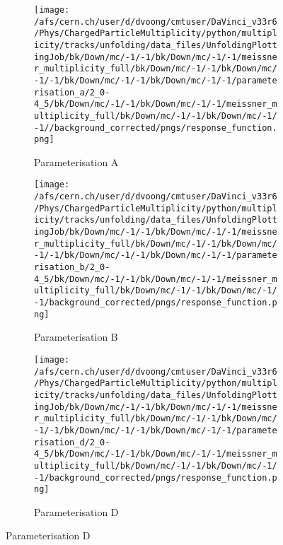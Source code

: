 \begin{figure}[h]
	\begin{subfigure}{0.49\textwidth}
		\texttt{[image: /afs/cern.ch/user/d/dvoong/cmtuser/DaVinci\_v33r6/Phys/ChargedParticleMultiplicity/python/multiplicity/tracks/unfolding/data\_files/UnfoldingPlottingJob/bk/Down/mc/-1/-1/bk/Down/mc/-1/-1/meissner\_multiplicity\_full/bk/Down/mc/-1/-1/bk/Down/mc/-1/-1/bk/Down/mc/-1/-1/bk/Down/mc/-1/-1/parameterisation\_a/2\_0-4\_5/bk/Down/mc/-1/-1/bk/Down/mc/-1/-1/meissner\_multiplicity\_full/bk/Down/mc/-1/-1/bk/Down/mc/-1/-1//background\_corrected/pngs/response\_function.png]}
		\caption{Parameterisation A}
	\end{subfigure}
	\begin{subfigure}{0.49\textwidth}
		\texttt{[image: /afs/cern.ch/user/d/dvoong/cmtuser/DaVinci\_v33r6/Phys/ChargedParticleMultiplicity/python/multiplicity/tracks/unfolding/data\_files/UnfoldingPlottingJob/bk/Down/mc/-1/-1/bk/Down/mc/-1/-1/meissner\_multiplicity\_full/bk/Down/mc/-1/-1/bk/Down/mc/-1/-1/bk/Down/mc/-1/-1/bk/Down/mc/-1/-1/parameterisation\_b/2\_0-4\_5/bk/Down/mc/-1/-1/bk/Down/mc/-1/-1/meissner\_multiplicity\_full/bk/Down/mc/-1/-1/bk/Down/mc/-1/-1/background\_corrected/pngs/response\_function.png]}
		\caption{Parameterisation B}
	\end{subfigure}
	\begin{subfigure}{0.49\textwidth}
		\texttt{[image: /afs/cern.ch/user/d/dvoong/cmtuser/DaVinci\_v33r6/Phys/ChargedParticleMultiplicity/python/multiplicity/tracks/unfolding/data\_files/UnfoldingPlottingJob/bk/Down/mc/-1/-1/bk/Down/mc/-1/-1/meissner\_multiplicity\_full/bk/Down/mc/-1/-1/bk/Down/mc/-1/-1/bk/Down/mc/-1/-1/bk/Down/mc/-1/-1/parameterisation\_d/2\_0-4\_5/bk/Down/mc/-1/-1/bk/Down/mc/-1/-1/meissner\_multiplicity\_full/bk/Down/mc/-1/-1/bk/Down/mc/-1/-1/background\_corrected/pngs/response\_function.png]}
		\caption{Parameterisation D}

\end{subfigure}
\end{figure}
